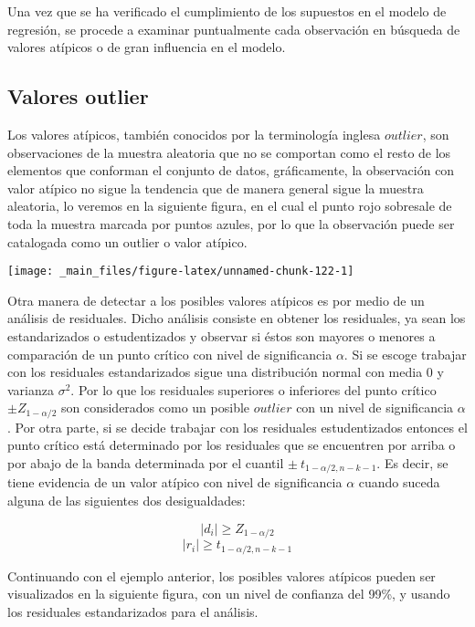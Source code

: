 \documentclass[
  a4paper,
  oneside,
  openany]{book}
\begin{document}
Una vez que se ha verificado el cumplimiento de los supuestos en el modelo de regresión, se procede a examinar puntualmente cada observación en búsqueda de valores atípicos o de gran influencia en el modelo.

\hypertarget{valores-outlier}{%
\subsection{Valores outlier}\label{valores-outlier}}

Los valores atípicos, también conocidos por la terminología inglesa \(outlier\), son observaciones de la muestra aleatoria que no se comportan como el resto de los elementos que conforman el conjunto de datos, gráficamente, la observación con valor atípico no sigue la tendencia que de manera general sigue la muestra aleatoria, lo veremos en la siguiente figura, en el cual el punto rojo sobresale de toda la muestra marcada por puntos azules, por lo que la observación puede ser catalogada como un outlier o valor atípico.

\begin{center}\texttt{[image: \_main\_files/figure-latex/unnamed-chunk-122-1]} \end{center}

Otra manera de detectar a los posibles valores atípicos es por medio de un análisis de residuales. Dicho análisis consiste en obtener los residuales, ya sean los estandarizados o estudentizados y observar si éstos son mayores o menores a comparación de un punto crítico con nivel de significancia \(\alpha\). Si se escoge trabajar con los residuales estandarizados sigue una distribución normal con media 0 y varianza \(\sigma^2\). Por lo que los residuales superiores o inferiores del punto crítico \(\pm Z_{1-\alpha/2}\) son considerados como un posible \(outlier\) con un nivel de significancia \(\alpha\). Por otra parte, si se decide trabajar con los residuales estudentizados entonces el punto crítico está determinado por los residuales que se encuentren por arriba o por abajo de la banda determinada por el cuantil \(\pm \ t_{1-\alpha/2,n-k-1}.\) Es decir, se tiene evidencia de un valor atípico con nivel de significancia \(\alpha\) cuando suceda alguna de las siguientes dos desigualdades:

\[\mid d_{i} \mid \geq Z_{1-\alpha/2}\]
\[\mid r_{i}\mid  \geq t_{1-\alpha/2,n-k-1}\]

Continuando con el ejemplo anterior, los posibles valores atípicos pueden ser visualizados en la siguiente figura, con un nivel de confianza del 99\%, y usando los residuales estandarizados para el análisis.
\end{document}
